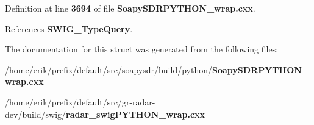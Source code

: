 Definition at line {\bf 3694} of file {\bf Soapy\+S\+D\+R\+P\+Y\+T\+H\+O\+N\+\_\+wrap.\+cxx}.



References {\bf S\+W\+I\+G\+\_\+\+Type\+Query}.



The documentation for this struct was generated from the following files\+:\begin{DoxyCompactItemize}
\item 
/home/erik/prefix/default/src/soapysdr/build/python/{\bf Soapy\+S\+D\+R\+P\+Y\+T\+H\+O\+N\+\_\+wrap.\+cxx}\item 
/home/erik/prefix/default/src/gr-\/radar-\/dev/build/swig/{\bf radar\+\_\+swig\+P\+Y\+T\+H\+O\+N\+\_\+wrap.\+cxx}\end{DoxyCompactItemize}

